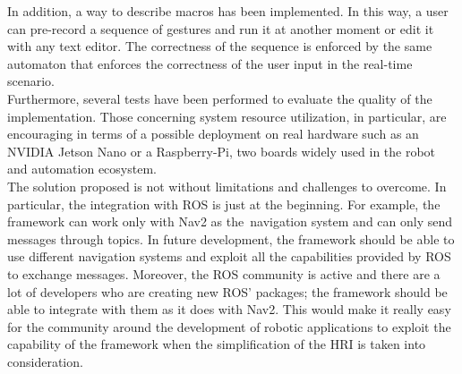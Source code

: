 \documentclass[../thesis.tex]{subfiles}
\begin{document}
In addition, a way to describe macros has been implemented. In this way, a user can pre-record a sequence of gestures and run it at another moment or edit it with any text editor. The correctness of the sequence is enforced by the same automaton that enforces the correctness of the user input in the real-time scenario.\\

Furthermore, several tests have been performed to evaluate the quality of the implementation. Those concerning system resource utilization, in particular, are encouraging in terms of a possible deployment on real hardware such as an NVIDIA Jetson Nano or a Raspberry-Pi, two boards widely used in the robot and automation ecosystem.\\

The solution proposed is not without limitations and challenges to overcome. In particular, the integration with \gls{ROS} is just at the beginning. For example, the framework can work only with Nav2 as the navigation system and can only send messages through topics. In future development, the framework should be able to use different navigation systems and exploit all the capabilities provided by \gls{ROS} to exchange messages. Moreover, the \gls{ROS} community is active and there are a lot of developers who are creating new \gls{ROS}' packages; the framework should be able to integrate with them as it does with Nav2. This would make it really easy for the community around the development of robotic applications to exploit the capability of the framework when the simplification of the \gls{HRI} is taken into consideration.
\end{document}
